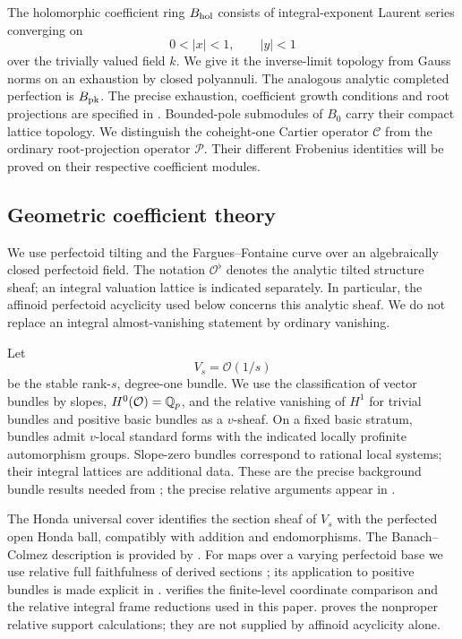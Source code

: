 The holomorphic coefficient ring \(B_{\mathrm{hol}}\) consists of integral-exponent
Laurent series converging on
\[
 0<|x|<1,\qquad |y|<1
\]
over the trivially valued field \(k\). We give it the inverse-limit
topology from Gauss norms on an exhaustion by closed polyannuli.
The analogous analytic completed perfection is \(B_{\mathrm{pk}}\).
The precise exhaustion, coefficient growth conditions and root
projections are specified in . Bounded-pole
submodules of \(B_0\) carry their compact lattice topology. We
distinguish the coheight-one Cartier operator \(\mathcal C\) from
the ordinary root-projection operator \(\mathcal P\). Their
different Frobenius identities will be proved on their respective
coefficient modules.

\subsection{Geometric coefficient theory}

We use perfectoid tilting and the Fargues--Fontaine curve over an
algebraically closed perfectoid field. The notation
\(\mathcal O^\flat\) denotes the analytic tilted structure sheaf;
an integral valuation lattice is indicated separately. In particular,
the affinoid perfectoid acyclicity used below concerns this analytic
sheaf. We do not replace an integral almost-vanishing statement by
ordinary vanishing.

Let
\[
 V_s=\mathcal O(1/s)
\]
be the stable rank-\(s\), degree-one bundle. We use the classification
of vector bundles by slopes, \(H^0(\mathcal O)=\mathbb Q_p\), and the
relative vanishing of \(H^1\) for trivial bundles and positive
basic bundles as a \(v\)-sheaf. On a fixed basic stratum, bundles admit \(v\)-local
standard forms with the indicated locally profinite automorphism
groups. Slope-zero bundles correspond to rational local systems;
their integral lattices are additional data. These are the precise
background bundle results needed from
\cite{FarguesFontaine,KedlayaLiu,ScholzeWeinstein}; the precise relative arguments appear in
.

The Honda universal cover identifies the section sheaf of \(V_s\)
with the perfected open Honda ball, compatibly with addition and
endomorphisms. The Banach--Colmez description is provided by
\cite{LeBras,ScholzeWeinstein}. For maps over a varying perfectoid base we use
relative full faithfulness of derived sections
\cite[Corollary~3.11]{AnschuetzLeBrasFourier}; its application to positive bundles
is made explicit in .
 verifies the finite-level coordinate comparison
and the relative integral frame reductions used in this paper.
 proves the nonproper relative support calculations;
they are not supplied by affinoid acyclicity alone.

